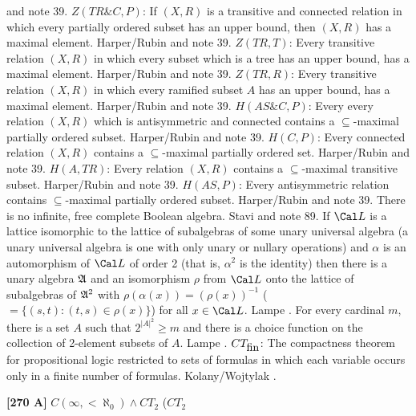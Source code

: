 and note 39.
\medskip
{} $Z(TR\&C,P)$: If $(X,R)$ is a transitive and
connected relation in which every partially ordered subset has an
upper bound, then $(X,R)$ has a maximal element. \ac{Harper/Rubin}
\cite{1976} and note 39.
\medskip
{} $Z(TR,T)$: Every transitive relation $(X,R)$ in
which every subset which is a tree has an upper bound, has a maximal
element. \ac{Harper/Rubin} \cite{1976} and note 39.
\medskip
{} $Z(TR,R)$: Every transitive relation $(X,R)$ in
which every ramified subset $A$ has an upper bound, has a maximal element.
\ac{Harper/Rubin} \cite{1976} and note 39.
\medskip
{} $H(AS\&C,P)$: Every every relation $(X,R)$ which is
antisymmetric and connected contains a $\subseteq$-maximal partially
ordered subset.  \ac{Harper/Rubin} \cite{1976} and note 39.
\medskip
{} $H(C,P)$: Every connected relation $(X,R)$
contains a $\subseteq$-maximal partially ordered set. \ac{Harper/Rubin}
\cite{1976} and note 39.
\medskip
{} $H(A,TR)$: Every relation $(X,R)$ contains a
$\subseteq$-maximal transitive subset.  \ac{Harper/Rubin} \cite{1976}
and note 39.
\medskip
{} $H(AS,P)$: Every antisymmetric relation contains
$\subseteq$-maximal partially ordered subset. \ac{Harper/Rubin} \cite{1976}
and note 39.
\medskip
{} There is no infinite, free complete Boolean
algebra.  \ac{Stavi} \cite{1975} and note 89.
\medskip
{}   If ${\Cal L}$  is  a  lattice  isomorphic  to
the  lattice  of subalgebras of some unary universal algebra (a unary
universal algebra is one with only unary or nullary operations) and
$\alpha $ is an automorphism of ${\Cal L}$ of order 2 (that is, $\alpha
^{2}$  is  the  identity) then there is a unary algebra $\frak A$  and an
isomorphism $\rho $  from ${\Cal L}$ onto the lattice of subalgebras
of $\frak A^{2}$ with $\rho(\alpha(x))=(\rho(x))^{-1}$ ($= \{(s,t) :
(t,s)\in\rho(x)\}$) for all $x\in  {\Cal L}$. \ac{Lampe} \cite{1974}.
\medskip
{} For every cardinal $m$, there is a set $A$ such
that $2^{|A|^2}\ge m$ and there is a choice function on the collection
of 2-element subsets of $A$.  \ac{Lampe} \cite{1974}.
\medskip
{} $CT_{\hbox{fin}}$: The compactness theorem for
propositional logic restricted to sets of formulas in which each
variable occurs only in a finite number of formulas. \ac{Kolany/Wojtylak}
\cite{1991}.
\smallskip
\item{}{\bf [270 A]}  $C(\infty,<\aleph_{0})\wedge CT_{2}$ ($CT_{2}$
